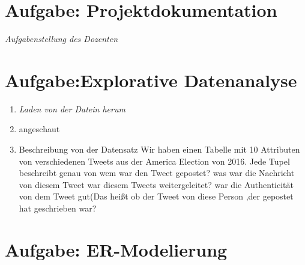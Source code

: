
\newcommand{\dozent}{Prof.  Dr.  Agnès Voisard, Nicolas Lehmann}					%
\newcommand{\tutor}{Hoffman Christian}						%
\newcommand{\tutoriumNo}{Tutorium 3}				%
\newcommand{\projectNo}{1}									%
\newcommand{\veranstaltung}{Datenbank Systeme}	%
\newcommand{\semester}{SoeSe 2017}						%
\newcommand{\studenten}{IngridTchilibou,Emil,Boyan Hristov}			%





\section{Aufgabe: Projektdokumentation}
{\itshape Aufgabenstellung des Dozenten}



\section{Aufgabe:Explorative Datenanalyse}
\begin{enumerate}[1)]
\item {\itshape Laden von der Datein herum}
\item{angeschaut}
\item{Beschreibung von der Datensatz}
Wir haben einen Tabelle mit 10 Attributen von verschiedenen Tweets aus der America Election von 2016. Jede Tupel beschreibt genau von wem war den Tweet gepostet? was war die Nachricht von diesem Tweet war diesem Tweets weitergeleitet? war die Authenticität von dem Tweet gut(Das heißt ob der Tweet von diese Person ,der gepostet hat geschrieben war?

\end{enumerate}

\section{Aufgabe: ER-Modelierung}

\newpage

